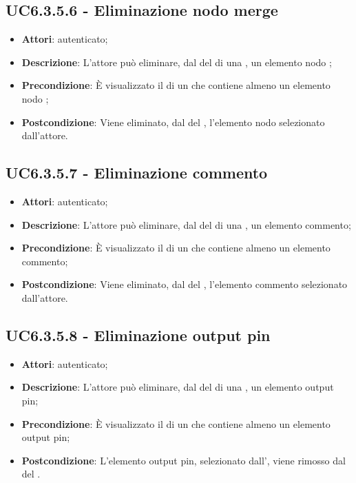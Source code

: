 \subsection{UC6.3.5.6 - Eliminazione nodo merge}
\label{ssec:UC6.3.5.6}
\begin{itemize}
\item \textbf{Attori}:  autenticato;
\item \textbf{Descrizione}: L'attore può eliminare, dal  del  di una , un elemento nodo ;
\item \textbf{Precondizione}: È visualizzato il  di un  che contiene almeno un elemento nodo ;
\item \textbf{Postcondizione}: Viene eliminato, dal  del ,  l'elemento nodo  selezionato dall'attore.
\end{itemize}
\subsection{UC6.3.5.7 - Eliminazione commento}
\label{ssec:UC6.3.5.7}
\begin{itemize}
\item \textbf{Attori}:  autenticato;
\item \textbf{Descrizione}: L'attore può eliminare, dal  del  di una , un elemento commento;
\item \textbf{Precondizione}: È visualizzato il  di un  che contiene almeno un elemento commento;
\item \textbf{Postcondizione}: Viene eliminato, dal  del ,  l'elemento commento selezionato dall'attore.
\end{itemize}
\subsection{UC6.3.5.8 - Eliminazione output pin}
\label{ssec:UC6.3.5.8}
\begin{itemize}
\item \textbf{Attori}:  autenticato;
\item \textbf{Descrizione}: L'attore può eliminare, dal  del  di una , un elemento output pin;
\item \textbf{Precondizione}: È visualizzato il  di un  che contiene almeno un elemento output pin;
\item \textbf{Postcondizione}: L'elemento output pin, selezionato dall', viene rimosso dal  del .
\end{itemize}
